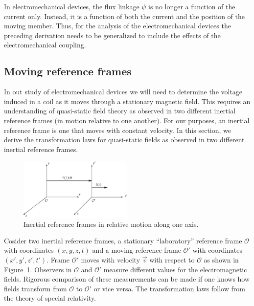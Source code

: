 \documentclass[11pt,a4paper,oneside]{book}
\numberwithin{equation}{section}
\theoremstyle{it}
\theoremstyle{definition}
\begin{document}
In electromechanical devices, the flux linkage $\psi$ is no longer a function of the current only. Instead, it is a function of both the current and the position of the moving member. Thus, for the analysis of the electromechanical devices the preceding derivation needs to be generalized to include the effects of the electromechanical coupling.

\subsection{Moving reference frames}
In out study of electromechanical devices we will need to determine the voltage induced in a coil as it moves through a stationary magnetic field. This requires an understanding of quasi-static field theory as observed in two different inertial reference frames (in motion relative to one another). For our purposes, an inertial reference frame is one that moves with constant velocity. In this section, we derive the transformation laws for quasi-static fields as observed in two different inertial reference frames.
\begin{figure}[H]
	\centering
	\includegraphics[width = 0.5\textwidth, width = 300pt, angle = 0, keepaspectratio]{figures/traslating_reference_frame.eps}
	\captionsetup{width=0.75\textwidth}		
	\caption{Inertial reference frames in relative motion along one axis.}
	\label{inertial_ref_frame}
\end{figure}
Cosider two inertial reference frames, a stationary “laboratory” reference frame $\mathcal{O}$ with coordinates $(x,y,z,t)$ and a moving reference frame $\mathcal{O'}$ with coordinates $(x',y',z',t')$. Frame $\mathcal{O'}$ moves with velocity $\vec{v}$ with respect to  $\mathcal{O}$ as shown in Figure~\ref{inertial_ref_frame}. Observers in $\mathcal{O}$ and $\mathcal{O'}$ measure different values for the electromagnetic fields. Rigorous comparison of these measurements can be made if one knows how fields transform from $\mathcal{O}$ to $\mathcal{O'}$ or vice versa. The transformation laws follow from the theory of special relativity. 
\end{document}
